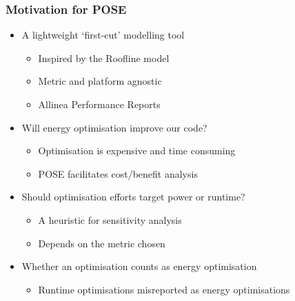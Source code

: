 \documentclass{beamer}
\begin{document}
  \begin{frame}
    \frametitle{Motivation for POSE}
    \begin{itemize}
      \item<1-> A lightweight `first-cut' modelling tool
      \begin{itemize}
        \item Inspired by the Roofline model
        \item Metric and platform agnostic 
        \item Allinea Performance Reports 
      \end{itemize}
      \item<2->{Will energy optimisation improve our code?}
      \begin{itemize}
        \item{Optimisation is expensive and time consuming}
        \item{POSE facilitates cost/benefit analysis}
      \end{itemize}
      \item<3->{Should optimisation efforts target power or runtime?}
      \begin{itemize}
        \item{A heuristic for sensitivity analysis}
        \item{Depends on the metric chosen}
      \end{itemize}
      \item<4->{Whether an optimisation counts as energy optimisation}
      \begin{itemize}
        \item Runtime optimisations misreported as energy optimisations 
      \end{itemize}
    \end{itemize}
   \end{frame}
\end{document}
